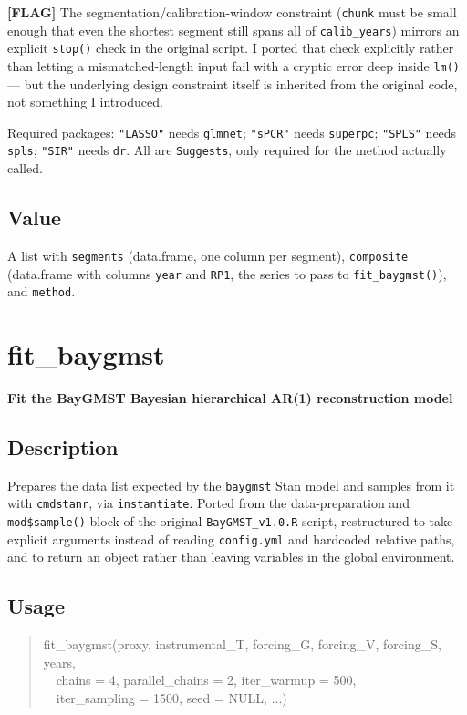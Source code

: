 \documentclass[10pt]{article}
\newcommand{\flag}[1]{\textcolor{gaporange}{\textbf{[FLAG]} #1}}
\newcommand{\rdtopic}[1]{\clearpage\section{#1}}
\newcommand{\rdsub}[1]{\subsection*{#1}}
\newenvironment{rdusage}{\begin{quote}\ttfamily\small}{\end{quote}}
\begin{document}
\flag{The segmentation/calibration-window constraint (\texttt{chunk} must
be small enough that even the shortest segment still spans all of
\texttt{calib\_years}) mirrors an explicit \texttt{stop()} check in the
original script. I ported that check explicitly rather than letting a
mismatched-length input fail with a cryptic error deep inside \texttt{lm()}
--- but the underlying design constraint itself is inherited from the
original code, not something I introduced.}

Required packages: \texttt{"LASSO"} needs \texttt{glmnet}; \texttt{"sPCR"}
needs \texttt{superpc}; \texttt{"SPLS"} needs \texttt{spls}; \texttt{"SIR"}
needs \texttt{dr}. All are \texttt{Suggests}, only required for the method
actually called.

\rdsub{Value}
A list with \texttt{segments} (data.frame, one column per segment),
\texttt{composite} (data.frame with columns \texttt{year} and \texttt{RP1},
the series to pass to \texttt{fit\_baygmst()}), and \texttt{method}.

\rdtopic{fit\_baygmst}
\textbf{Fit the BayGMST Bayesian hierarchical AR(1) reconstruction model}

\rdsub{Description}
Prepares the data list expected by the \texttt{baygmst} Stan model and
samples from it with \texttt{cmdstanr}, via \texttt{instantiate}. Ported
from the data-preparation and \texttt{mod\$sample()} block of the original
\texttt{BayGMST\_v1.0.R} script, restructured to take explicit arguments
instead of reading \texttt{config.yml} and hardcoded relative paths, and to
return an object rather than leaving variables in the global environment.

\rdsub{Usage}
\begin{rdusage}
fit\_baygmst(proxy, instrumental\_T, forcing\_G, forcing\_V, forcing\_S, years,\\
\ \ chains = 4, parallel\_chains = 2, iter\_warmup = 500,\\
\ \ iter\_sampling = 1500, seed = NULL, ...)
\end{rdusage}
\end{document}
